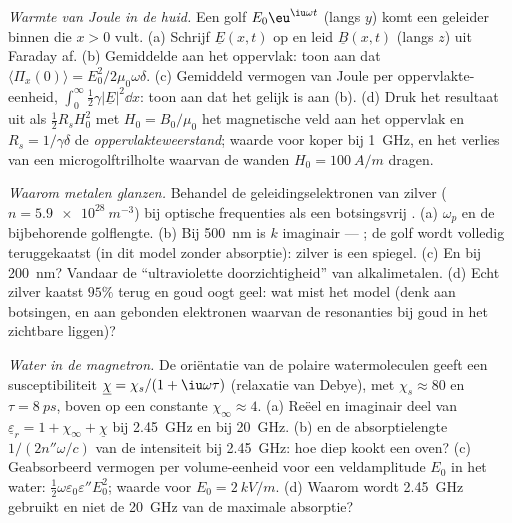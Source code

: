 \begin{exercise}[$\star\star\star$]\label{exo:b2:waves-in-media:10}
\emph{Warmte van Joule in de huid.} Een golf $E_0\eu^{\iu\omega t}$ (langs
$y$) komt een geleider binnen die $x > 0$ vult. (a) Schrijf
$\underline E(x, t)$ op en leid $\underline B(x, t)$ (langs $z$) uit Faraday
af. (b) Gemiddelde  aan het oppervlak: toon aan dat
$\langle\Pi_x(0)\rangle = E_0^2/2\mu_0\omega\delta$. (c) Gemiddeld vermogen
van Joule per oppervlakte-eenheid,
$\int_0^\infty\tfrac12\gamma|\underline E|^2\dd x$: toon aan dat het gelijk
is aan (b). (d) Druk het resultaat uit als $\tfrac12R_sH_0^2$ met
$H_0 = B_0/\mu_0$ het magnetische veld aan het oppervlak en
$R_s = 1/\gamma\delta$ de \emph{oppervlakteweerstand}; waarde voor koper bij
\qty{1}{GHz}, en het verlies van een microgolftrilholte waarvan de wanden
$H_0 = \qty{100}{A/m}$ dragen.
\end{exercise}

\begin{exercise}[$\star\star\star$]\label{exo:b2:waves-in-media:11}
\emph{Waarom metalen glanzen.} Behandel de geleidingselektronen van zilver
($n =
\qty{5.9e28}{m^{-3}}$) bij optische frequenties als een botsingsvrij
. (a) $\omega_p$ en de bijbehorende golflengte. (b) Bij \qty{500}{nm}
is $k$ imaginair --- ; de golf wordt volledig teruggekaatst (in
dit model zonder absorptie): zilver is een spiegel. (c) En bij
\qty{200}{nm}? Vandaar de ``ultraviolette doorzichtigheid'' van
alkalimetalen. (d) Echt zilver kaatst $95\%$ terug en goud oogt geel: wat
mist het model (denk aan botsingen, en aan gebonden elektronen waarvan de
resonanties bij goud in het zichtbare liggen)?
\end{exercise}

\begin{exercise}[$\star\star\star$]\label{exo:b2:waves-in-media:12}
\emph{Water in de magnetron.} De oriëntatie van de polaire watermoleculen
geeft een susceptibiliteit $\underline\chi = \chi_s/(1 + \iu\omega\tau)$
(relaxatie van Debye), met $\chi_s \approx 80$ en $\tau = \qty{8}{ps}$,
boven op een constante $\chi_\infty \approx 4$. (a) Reëel en imaginair deel
van $\underline\varepsilon_r = 1 + \chi_\infty
+ \underline\chi$ bij
\qty{2.45}{GHz} en bij \qty{20}{GHz}. (b)  en de
absorptielengte $1/(2n''\omega/c)$ van de intensiteit bij \qty{2.45}{GHz}:
hoe diep kookt een oven? (c) Geabsorbeerd vermogen per volume-eenheid voor
een veldamplitude $E_0$ in het water:
$\tfrac12\omega\varepsilon_0\varepsilon''E_0^2$; waarde voor
$E_0 = \qty{2}{kV/m}$. (d) Waarom wordt \qty{2.45}{GHz} gebruikt en niet de
\qty{20}{GHz} van de maximale absorptie?
\end{exercise}

